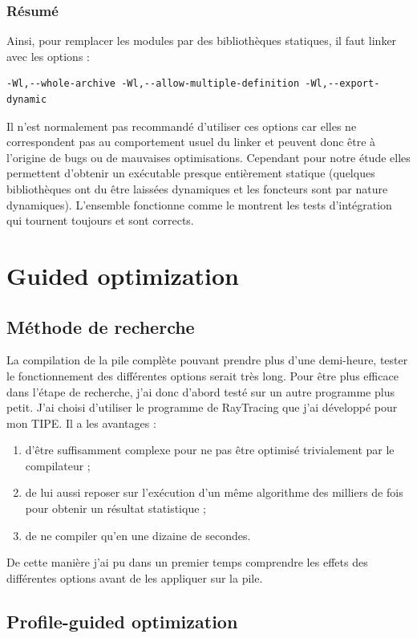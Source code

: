 \documentclass[a4paper,11pt]{report}
\begin{document}
\subsubsection{Résumé}
Ainsi, pour remplacer les modules par des bibliothèques statiques, il faut linker avec les options :
\begin{verbatim}
-Wl,--whole-archive -Wl,--allow-multiple-definition -Wl,--export-dynamic
\end{verbatim}

Il n'est normalement pas recommandé d'utiliser ces options car elles ne correspondent pas au comportement usuel du linker et peuvent donc être à l'origine de bugs ou de mauvaises optimisations.
Cependant pour notre étude elles permettent d'obtenir un exécutable presque entièrement statique (quelques bibliothèques ont du être laissées dynamiques et les foncteurs sont par nature dynamiques).
L'ensemble fonctionne comme le montrent les tests d'intégration qui tournent toujours et sont corrects.

\section{Guided optimization}
\subsection{Méthode de recherche}
La compilation de la pile complète pouvant prendre plus d'une demi-heure, tester le fonctionnement des différentes options serait très long.
Pour être plus efficace dans l'étape de recherche, j'ai donc d'abord testé sur un autre programme plus petit.
J'ai choisi d'utiliser le programme de RayTracing que j'ai développé pour mon TIPE.
Il a les avantages :
\begin{enumerate}
    \item d'être suffisamment complexe pour ne pas être optimisé trivialement par le compilateur ;
    \item de lui aussi reposer sur l'exécution d'un même algorithme des milliers de fois pour obtenir un résultat statistique ;
    \item de ne compiler qu'en une dizaine de secondes.
\end{enumerate}
De cette manière j'ai pu dans un premier temps comprendre les effets des différentes options avant de les appliquer sur la pile.

\subsection{Profile-guided optimization}
\end{document}
